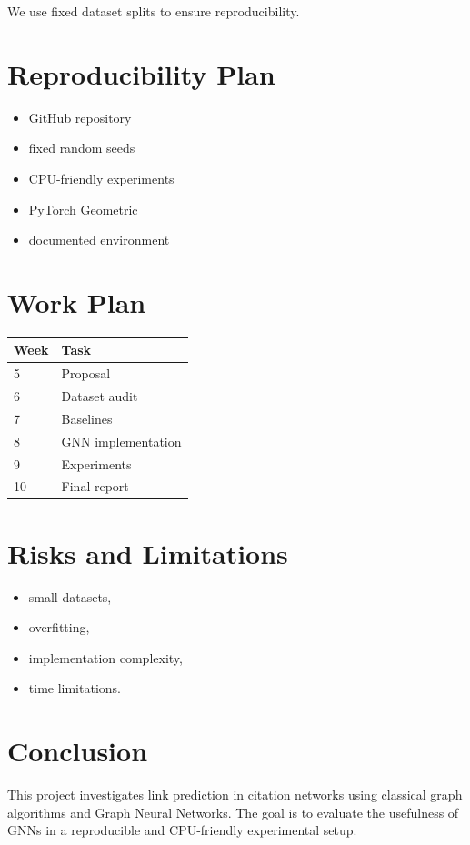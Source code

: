 \documentclass[11pt,a4paper]{article}
\begin{document}
We use fixed dataset splits to ensure reproducibility.

\section{Reproducibility Plan}

\begin{itemize}
\item GitHub repository
\item fixed random seeds
\item CPU-friendly experiments
\item PyTorch Geometric
\item documented environment
\end{itemize}

\section{Work Plan}

\begin{tabular}{ll}
\toprule
Week & Task \\
\midrule
5 & Proposal \\
6 & Dataset audit \\
7 & Baselines \\
8 & GNN implementation \\
9 & Experiments \\
10 & Final report \\
\bottomrule
\end{tabular}

\section{Risks and Limitations}

\begin{itemize}
\item small datasets,
\item overfitting,
\item implementation complexity,
\item time limitations.
\end{itemize}

\section{Conclusion}

This project investigates link prediction in citation networks
using classical graph algorithms and Graph Neural Networks.
The goal is to evaluate the usefulness of GNNs
in a reproducible and CPU-friendly experimental setup.



\end{document}
